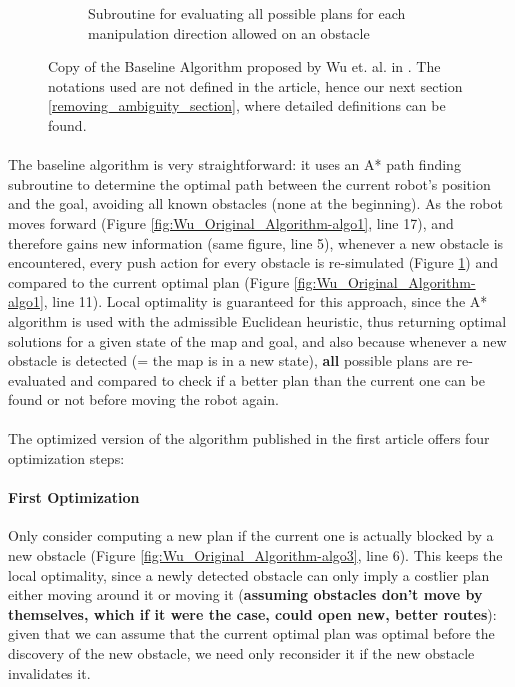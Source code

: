 \begin{figure}[H]
\begin{subfigure}{.45\textwidth}
  \caption{Subroutine for evaluating all possible plans for each manipulation direction allowed on an obstacle}
  \label{fig:Wu_Original_Algorithm-algo2}
\end{subfigure}
\caption{Copy of the Baseline Algorithm proposed by Wu et. al. in \parencite{wu_navigation_2010}. The notations used are not defined in the article, hence our next section \ref{removing_ambiguity_section}, where detailed definitions can be found.}
\label{fig:Wu_Original_Algorithm-baseline}
\end{figure}

\paragraph{} The baseline algorithm is very straightforward: it uses an A* path finding subroutine to determine the optimal path between the current robot's position and the goal, avoiding all known obstacles (none at the beginning). As the robot moves forward (Figure \ref{fig:Wu_Original_Algorithm-algo1}, line 17), and therefore gains new information (same figure, line 5), whenever a new obstacle is encountered, every push action for every obstacle is re-simulated (Figure \ref{fig:Wu_Original_Algorithm-algo2}) and compared to the current optimal plan (Figure \ref{fig:Wu_Original_Algorithm-algo1}, line 11). Local optimality is guaranteed for this approach, since the A* algorithm is used with the admissible Euclidean heuristic, thus returning optimal solutions for a given state of the map and goal, and also because whenever a new obstacle is detected (= the map is in a new state), \textbf{all} possible plans are re-evaluated and compared to check if a better plan than the current one can be found or not before moving the robot again.

\paragraph{} The optimized version of the algorithm published in the first article offers four optimization steps:

\paragraph{First Optimization}\label{optimization_1} Only consider computing a new plan if the current one is actually blocked by a new obstacle (Figure \ref{fig:Wu_Original_Algorithm-algo3}, line 6). This keeps the local optimality, since a newly detected obstacle can only imply a costlier plan either moving around it or moving it (\textbf{assuming obstacles don't move by themselves, which if it were the case, could open new, better routes}): given that we can assume that the current optimal plan was optimal before the discovery of the new obstacle, we need only reconsider it if the new obstacle invalidates it.

